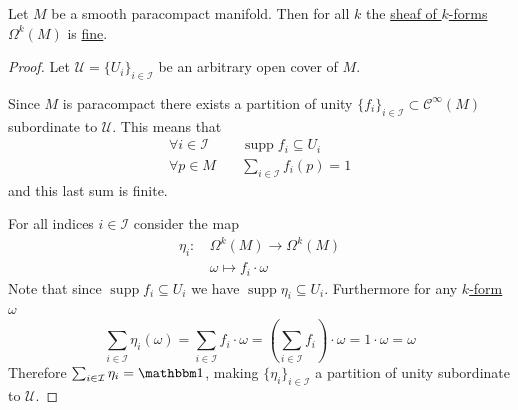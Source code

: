 \documentclass[../../main]{subfiles}
\begin{document}
\begin{lemma} \label{lemma:smooth-k-form-fine}
  Let \(M\) be a smooth paracompact manifold.
  Then for all \(k\) the \hyperref[def:smooth-k-form]{sheaf of \(k\)-forms} \(\Omega^{k}(M)\) is \hyperref[def:fine-sheaf]{fine}.
\end{lemma}
\begin{proof}
  Let \(\mathscr{U} = \{U_{i}\}_{i \in \mathcal{I}}\) be an arbitrary open cover of \(M\).

  Since \(M\) is paracompact there exists a partition of unity \(\{f_{i}\}_{i \in \mathcal{I}} \subset \mathcal{C}^{\infty}(M)\) subordinate to \(\mathscr{U}\).
  This means that
  \begin{align*}
    \forall i \in \mathcal{I} \quad& \operatorname{supp} f_{i} \subseteq U_{i} \\
    \forall p \in M \quad& \sum_{i \in \mathcal{I}} f_{i}(p) = 1
  \end{align*}
  and this last sum is finite.

  For all indices \(i \in \mathcal{I}\) consider the map
  \begin{align*}
    \eta_{i}:\,& \Omega^{k}(M) \to \Omega^{k}(M) \\
            & \omega \mapsto f_{i} \cdot \omega
  \end{align*}
  Note that since \(\operatorname{supp} f_{i} \subseteq U_{i}\) we have \(\operatorname{supp} \eta_{i} \subseteq U_{i}\).
  Furthermore for any \hyperref[def:smooth-k-form]{\(k\)-form} \(\omega\)
  \begin{equation*}
    \sum_{i \in \mathcal{I}} \eta_{i}(\omega) = \sum_{i \in \mathcal{I}} f_{i} \cdot \omega = \left( \sum_{i \in \mathcal{I}} f_{i} \right) \cdot \omega = 1 \cdot \omega = \omega
  \end{equation*}
  Therefore \(\sum_{i \in \mathcal{I}} \eta_{i} = \id\), making \(\{\eta_{i}\}_{i \in \mathcal{I}}\) a partition of unity subordinate to \(\mathscr{U}\).
\end{proof}
\end{document}
